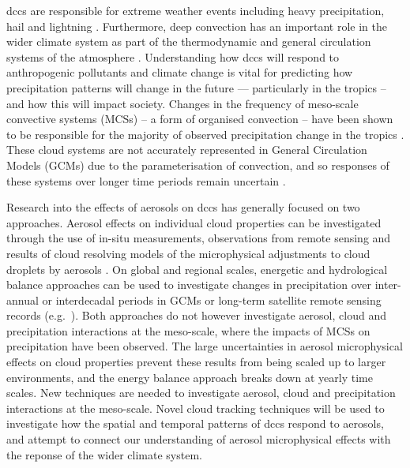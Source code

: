 \acrshort{dcc}s are responsible for extreme weather events including heavy precipitation, hail and lightning \citep{westra_future_2014}. Furthermore, deep convection has an important role in the wider climate system as part of the thermodynamic and general circulation systems of the atmosphere \citep{weisman_mesoscale_2015}. Understanding how \acrshort{dcc}s will respond to anthropogenic pollutants and climate change is vital for predicting how precipitation patterns will change in the future --- particularly in the tropics – and how this will impact society. 
Changes in the frequency of meso-scale convective systems (MCSs) – a form of organised convection – have been shown to be responsible for the majority of observed precipitation change in the tropics \citep{tan_increases_2015}. 
These cloud systems are not accurately represented in General Circulation Models (GCMs) due to the parameterisation of convection, and so responses of these systems over longer time periods remain uncertain \citep{ogorman_precipitation_2015}.

Research into the effects of aerosols on \acrshort{dcc}s has generally focused on two approaches. Aerosol effects on individual cloud properties can be investigated through the use of in-situ measurements, observations from remote sensing and results of cloud resolving models of the microphysical adjustments to cloud droplets by aerosols \citep{khain2005aerosol}. 
On global and regional scales, energetic and hydrological balance approaches can be used to investigate changes in precipitation over inter-annual or interdecadal periods in GCMs or long-term satellite remote sensing records (e.g.\ \citet{allen_constraints_2002, held_robust_2006, muller_energetic_2011, richardson_drivers_2018}). 
Both approaches do not however investigate aerosol, cloud and precipitation interactions at the meso-scale, where the impacts of MCSs on precipitation have been observed. 
The large uncertainties in aerosol microphysical effects on cloud properties prevent these results from being scaled up to larger environments, and the energy balance approach breaks down at yearly time scales. 
New techniques are needed to investigate aerosol, cloud and precipitation interactions at the meso-scale. 
Novel cloud tracking techniques will be used to investigate how the spatial and temporal patterns of \acrshort{dcc}s respond to aerosols, and attempt to connect our understanding of aerosol microphysical effects with the reponse of the wider climate system.


